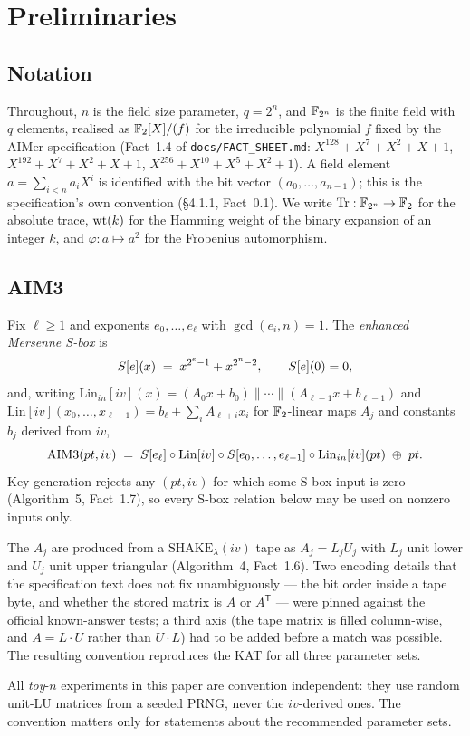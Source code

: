 \section{Preliminaries}\label{sec:prelim}

\subsection{Notation}

Throughout, $n$ is the field size parameter, $q=2^n$, and $\mathbb{F}_{2^n}$ is the finite field with $q$
elements, realised as $\mathbb{F}_2[X]/(f)$ for the irreducible polynomial $f$ fixed by the AIMer
specification (Fact~1.4 of \texttt{docs/FACT\_SHEET.md}: $X^{128}+X^7+X^2+X+1$,
$X^{192}+X^7+X^2+X+1$, $X^{256}+X^{10}+X^5+X^2+1$). A field element $a=\sum_{i<n} a_i X^i$ is
identified with the bit vector $(a_0,\dots,a_{n-1})$; this is the specification's own convention
(\S4.1.1, Fact~0.1). We write $\operatorname{Tr}:\mathbb{F}_{2^n}\to\mathbb{F}_2$ for the absolute trace, $\operatorname{wt}(k)$ for the Hamming
weight of the binary expansion of an integer $k$, and $\varphi:a\mapsto a^2$ for the Frobenius
automorphism.

\subsection{AIM3}

\begin{definition}\label{def:aim3}
Fix $\ell\ge 1$ and exponents $e_0,\dots,e_\ell$ with $\gcd(e_i,n)=1$. The \emph{enhanced Mersenne
S-box} is
\[
  S[e](x) \;=\; x^{2^e-1}+x^{2^n-2},\qquad S[e](0)=0 ,
\]
and, writing $\mathrm{Lin}_{in}[iv](x)=(A_0x+b_0)\|\cdots\|(A_{\ell-1}x+b_{\ell-1})$ and
$\mathrm{Lin}[iv](x_0,\dots,x_{\ell-1})=b_\ell+\sum_i A_{\ell+i}x_i$ for $\mathbb{F}_2$-linear maps $A_j$
and constants $b_j$ derived from $iv$,
\[
  \mathrm{AIM3}(pt,iv)\;=\;S[e_\ell]\circ \mathrm{Lin}[iv]\circ
    S[e_0,\dots,e_{\ell-1}]\circ \mathrm{Lin}_{in}[iv](pt)\;\oplus\;pt .
\]
Key generation rejects any $(pt,iv)$ for which some S-box input is zero (Algorithm~5, Fact~1.7), so
every S-box relation below may be used on nonzero inputs only.
\end{definition}

The $A_j$ are produced from a $\mathrm{SHAKE}_\lambda(iv)$ tape as $A_j=L_jU_j$ with $L_j$ unit lower
and $U_j$ unit upper triangular (Algorithm~4, Fact~1.6). Two encoding details that the specification
text does not fix unambiguously --- the bit order inside a tape byte, and whether the stored matrix
is $A$ or $A^{\mathsf T}$ --- were pinned against the official known-answer tests; a third axis (the
tape matrix is filled column-wise, and $A=L\cdot U$ rather than $U\cdot L$) had to be added before a
match was possible. The resulting convention reproduces the KAT for all three parameter sets.
\begin{remark}\label{rem:conventions}
All \emph{toy}-$n$ experiments in this paper are convention independent: they use random unit-LU
matrices from a seeded PRNG, never the $iv$-derived ones. The convention matters only for statements
about the recommended parameter sets.
\end{remark}

